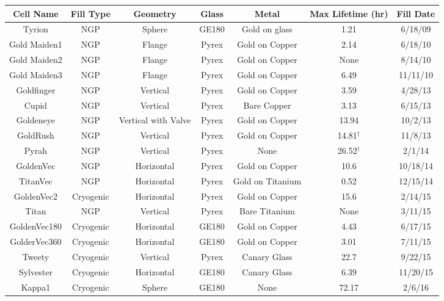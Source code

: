 \begin{table}\scriptsize
	\captionsetup{font=scriptsize}
	\begin{center}
		\def\arraystretch{0.75}
		\setlength\tabcolsep{2pt}
		\begin{tabular}{|c|c|c|c|c|c|c|}
			\hline
			Cell Name & Fill Type & Geometry & Glass & Metal & Max Lifetime (hr) & Fill Date\\ \hline
			Tyrion & NGP & Sphere & GE180 & Gold on glass & 1.21 & 6/18/09 \\ \hline
			Gold Maiden1 & NGP & Flange & Pyrex & Gold on Copper & 2.14 & 6/18/10 \\ \hline
			Gold Maiden2 & NGP & Flange & Pyrex & Gold on Copper & None & 8/14/10\\ \hline
			Gold Maiden3 & NGP & Flange & Pyrex & Gold on Copper & 6.49 & 11/11/10\\ \hline
			Goldfinger & NGP & Vertical & Pyrex & Gold on Copper & 3.59 & 4/28/13\\ \hline
			Cupid & NGP & Vertical & Pyrex & Bare Copper & 3.13 & 6/15/13\\ \hline
			Goldeneye & NGP & Vertical with Valve & Pyrex & Gold on Copper & 13.94 & 10/2/13\\ \hline
			GoldRush & NGP & Vertical & Pyrex & Gold on Copper & 14.81$^\dagger$  & 11/8/13\\ \hline
			Pyrah & NGP & Vertical & Pyrex & None & 26.52$^\dagger$ & 2/1/14\\ \hline
			GoldenVec & NGP & Horizontal & Pyrex & Gold on Copper & 10.6 & 10/18/14\\ \hline
			TitanVec & NGP & Horizontal & Pyrex & Gold on Titanium & 0.52 & 12/15/14\\ \hline
			GoldenVec2 & Cryogenic & Horizontal & Pyrex & Gold on Copper & 15.6 & 2/14/15\\ \hline
			Titan & NGP & Vertical & Pyrex & Bare Titanium & None & 3/11/15\\ \hline
			GoldenVec180 & Cryogenic & Horizontal & GE180 & Gold on Copper & 4.43 & 6/17/15\\ \hline
			GolderVec360 & Cryogenic & Horizontal & GE180 & Gold on Copper & 3.01 & 7/11/15\\ \hline
			Tweety & Cryogenic & Vertical & Pyrex & Canary Glass & 22.7 & 9/22/15 \\ \hline
			Sylvester & Cryogenic & Horizontal & GE180 & Canary Glass & 6.39 & 11/20/15\\ \hline
			Kappa1 & Cryogenic & Sphere & GE180 & None & 72.17 & 2/6/16\\ \hline

\end{tabular}
\end{center}
\end{table}
